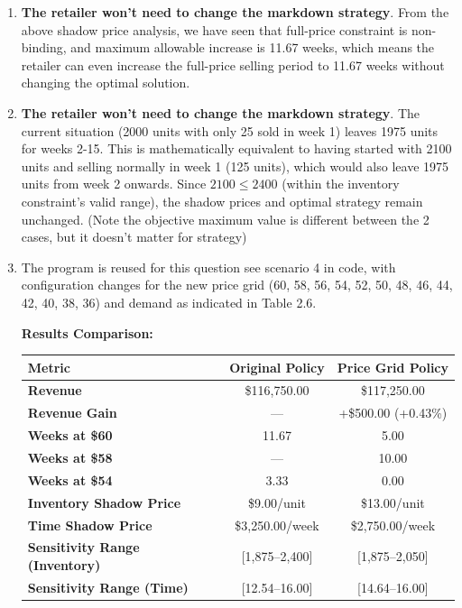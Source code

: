 \documentclass[12pt]{article}
\begin{document}
\begin{enumerate}[label= (\alph*), leftmargin=2em]
\item \textbf{The retailer won't need to change the markdown strategy}. From the above shadow price analysis, we have seen that full-price constraint is non-binding, and maximum allowable increase is 11.67 weeks, which means the retailer can even increase the full-price selling period to 11.67 weeks without changing the optimal solution.
\item \textbf{The retailer won't need to change the markdown strategy}. The current situation (2000 units with only 25 sold in week 1) leaves 1975 units for weeks 2-15. This is mathematically equivalent to having started with 2100 units and selling normally in week 1 (125 units), which would also leave 1975 units from week 2 onwards. Since $2100 \leq 2400$ (within the inventory constraint's valid range), the shadow prices and optimal strategy remain unchanged. (Note the objective maximum value is different between the 2 cases, but it doesn't matter for strategy)
\item The program is reused for this question see scenario 4 in code, with configuration changes for the new price grid (60, 58, 56, 54, 52, 50, 48, 46, 44, 42, 40, 38, 36) and demand as indicated in Table 2.6. 

\textbf{Results Comparison:}
\begin{tcolorbox}[colback=white, colframe=gray, title=Policy Comparison: Original vs Price Grid Strategy]

\begin{center}
\begin{tabular}{lcc}
\toprule
\textbf{Metric} & \textbf{Original Policy} & \textbf{Price Grid Policy} \\
\midrule
\textbf{Revenue} & \$116,750.00 & \$117,250.00 \\
\textbf{Revenue Gain} & --- & +\$500.00 (+0.43\%) \\
\midrule
\textbf{Weeks at \$60} & 11.67 & 5.00 \\
\textbf{Weeks at \$58} & --- & 10.00 \\
\textbf{Weeks at \$54} & 3.33 & 0.00 \\
\midrule
\textbf{Inventory Shadow Price} & \$9.00/unit & \$13.00/unit \\
\textbf{Time Shadow Price} & \$3,250.00/week & \$2,750.00/week \\
\textbf{Sensitivity Range (Inventory)} & [1,875--2,400] & [1,875--2,050] \\
\textbf{Sensitivity Range (Time)} & [12.54--16.00] & [14.64--16.00] \\
\bottomrule
\end{tabular}
\end{center}
\end{tcolorbox}


\end{enumerate}
\end{document}
